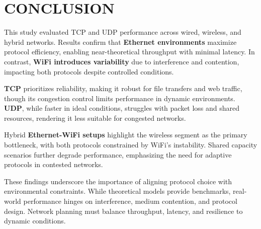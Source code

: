\section{CONCLUSION} \label{sec:conclusion}

This study evaluated TCP and UDP performance across wired, wireless, and hybrid networks. Results confirm that \textbf{Ethernet environments} maximize protocol efficiency, enabling near-theoretical throughput with minimal latency. In contrast, \textbf{WiFi introduces variability} due to interference and contention, impacting both protocols despite controlled conditions.

\textbf{TCP} prioritizes reliability, making it robust for file transfers and web traffic, though its congestion control limits performance in dynamic environments. \textbf{UDP}, while faster in ideal conditions, struggles with packet loss and shared resources, rendering it less suitable for congested networks.

Hybrid \textbf{Ethernet-WiFi setups} highlight the wireless segment as the primary bottleneck, with both protocols constrained by WiFi’s instability. Shared capacity scenarios further degrade performance, emphasizing the need for adaptive protocols in contested networks.

These findings underscore the importance of aligning protocol choice with environmental constraints. While theoretical models provide benchmarks, real-world performance hinges on interference, medium contention, and protocol design. Network planning must balance throughput, latency, and resilience to dynamic conditions.
